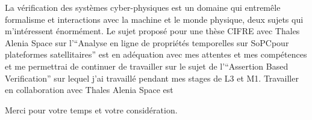 \documentclass[11pt, a4paper]{awesome-cv} %
\begin{document}



La vérification des systèmes cyber-physiques est un domaine qui
entremêle formalisme et interactions avec la machine et le monde
physique, deux sujets qui m'intéressent énormément. Le sujet proposé
pour une thèse CIFRE avec Thales Alenia Space sur l'``Analyse en ligne
de propriétés temporelles sur SoPCpour plateformes satellitaires'' est
en adéquation avec mes attentes et mes compétences et me permettrai de
continuer de travailler sur le sujet de l'``Assertion Based
Verification'' sur lequel j'ai travaillé pendant mes stages de L3 et
M1. Travailler en collaboration avec Thales Alenia Space est


Merci pour votre temps et votre considération.


% 


% 
% 
% 
% 
% 

\end{document}
